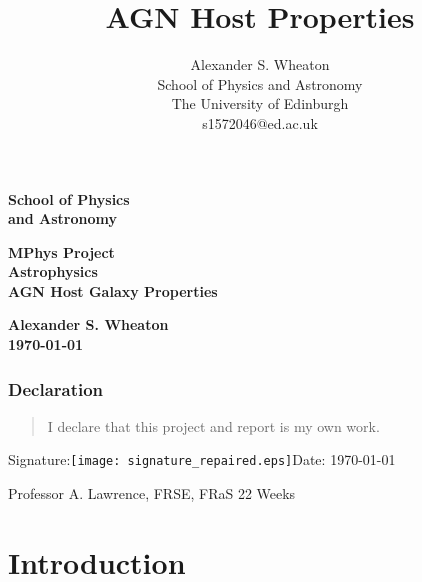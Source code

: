 \documentclass[a4paper,11pt]{article}
\title{AGN Host Properties}
\author{
    Alexander S. Wheaton\\
    School of Physics and Astronomy\\
    The University of Edinburgh\\
    s1572046@ed.ac.uk\break
}
\begin{document}
\thispagestyle{empty}                   %
\epsfxsize=40mm                         %
\begin{minipage}[b]{110mm}
    {\Huge\bf School of Physics\\ and Astronomy
    \vspace*{17mm}}
\end{minipage}
\hfill
\begin{minipage}[t]{40mm}
\end{minipage}
\par\noindent                                           %
\vspace*{2cm}
\begin{center}
    \Large\bf \Large\bf MPhys Project\\
    \Large\bf Astrophysics\\[10pt]                     %
    \LARGE\bf AGN Host Galaxy Properties
\end{center}
\vspace*{0.5cm}
\begin{center}
    \bf Alexander S. Wheaton\\
    \today
\end{center}
\vspace*{5mm}

\begin{abstract}
    \lipsum[1]
\end{abstract}

\vspace*{1cm}

\subsubsection*{Declaration}
\begin{quotation}
    I declare that this project and report is my own work.
\end{quotation}

\hspace*{1cm}Signature:\hspace*{1cm}\texttt{[image: signature\_repaired.eps]}\hspace*{1cm}Date: \today

\vfill
{} Professor A. Lawrence, FRSE, FRaS
\hfill
22 Weeks

\newpage
\setcounter{page}{1} %
\tableofcontents

\newpage
\section{Introduction}\label{sec:introduction}
\end{document}
